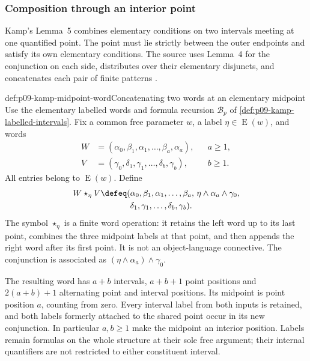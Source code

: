 
\subsubsection{Composition through an interior point}
\label{sec:p09-kamp-iii2-lemma5}

Kamp's Lemma~5 combines elementary conditions on two intervals meeting at
one quantified point. The point must lie strictly between the outer
endpoints and satisfy its own elementary conditions. The source uses
Lemma~4 for the conjunction on each side, distributes over their
elementary disjuncts, and concatenates each pair of finite patterns
\cite[ch.~III, lemma~5, pp.~78--79]{Kamp1968}.

\begin{hbdefinition}{def:p09-kamp-midpoint-word}{Concatenating two words at an elementary midpoint}
Use the elementary labelled words and formula recursion
\(\mathcal B_p\) of \cref{def:p09-kamp-labelled-intervals}.
Fix a common free parameter \(w\), a label
\(\eta\in\operatorname{E}(w)\), and words
\[
\begin{aligned}
 W&=(\alpha_0,\beta_1,\alpha_1,\ldots,\beta_a,\alpha_a),
       &&a\geq1,\\
 V&=(\gamma_0,\delta_1,\gamma_1,\ldots,\delta_b,\gamma_b),
       &&b\geq1.
\end{aligned}
\]
All entries belong to \(\operatorname{E}(w)\). Define
\[
\begin{split}
 W\mathbin{\star_\eta}V\defeq
  (&\alpha_0,\beta_1,\alpha_1,\ldots,\beta_a,\,
                  \eta\land\alpha_a\land\gamma_0,\\
   &\delta_1,\gamma_1,\ldots,\delta_b,\gamma_b).
\end{split}
\]
The symbol \(\star_\eta\) is a finite word operation: it retains the
left word up to its last point, combines the three midpoint labels at
that point, and then appends the right word after its first point.
It is not an object-language connective.
The conjunction is associated as \((\eta\land\alpha_a)\land\gamma_0\).

The resulting word has \(a+b\) intervals, \(a+b+1\) point positions
and \(2(a+b)+1\) alternating point and interval positions. Its midpoint
is point position \(a\), counting from zero. Every interval label from
both inputs is retained, and both labels formerly attached to the shared
point occur in its new conjunction. In particular \(a,b\geq1\) make
the midpoint an interior position. Labels remain formulas on the whole
structure at their sole free argument; their internal quantifiers are
not restricted to either constituent interval.
\end{hbdefinition}

